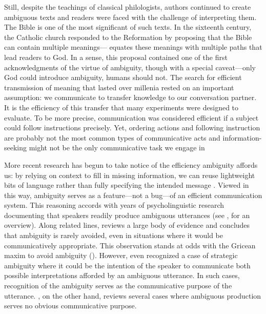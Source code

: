 \documentclass[10pt,a4paper]{article}
\newcommand{\gcs}[1]{\textcolor{blue}{[gcs: #1]}}
\begin{document}
Still, despite the teachings of classical philologists, authors continued to  create ambiguous texts and readers were faced with the challenge of interpreting them. The Bible is one of the most significant of such texts. In the sixteenth century, the Catholic church responded to the Reformation by proposing that the Bible can contain multiple meanings--- equates these meanings with multiple paths that lead readers to God. In a sense, this proposal contained one of the first acknowledgments of the virtue of ambiguity, though with a  special caveat---only God could introduce ambiguity, humans should not. The search for efficient transmission of meaning that lasted over millenia rested on an important assumption: we communicate to transfer knowledge to our conversation partner. It is the efficiency of this transfer that many experiments were designed to evaluate. To be more precise, communication was considered efficient if a subject could follow instructions precisely. Yet, ordering actions and following instruction are probably not  the most common types of communicative acts \cite{foppa1995mutual} and information-seeking might not be the only communicative task we engage in \cite{markova1995preface}

More recent research has begun to take notice of the efficiency ambiguity affords us: by relying on context to fill in missing information, we can reuse lightweight bits of language rather than fully specifying the intended message \cite{levinson2000,piantadosietal2012,wasow2015}. 
Viewed in this way, ambiguity serves as a feature---not a bug---of an efficient communication system.
This reasoning accords with years of psycholinguistic research documenting that speakers readily produce ambiguous utterances (see , for an overview). 
Along related lines,  reviews a large body of evidence and concludes that ambiguity is rarely avoided, even in situations where it would be communicatively appropriate.
This observation stands at odds with the Gricean maxim to avoid ambiguity ().
However, even \citeauthor{grice1975} recognized a case of strategic ambiguity where it could be the intention of the speaker to communicate both possible interpretations afforded by an ambiguous utterance. In such cases, recognition of the ambiguity serves as the communicative purpose of the utterance. \citeauthor{wasow2015}, on the other hand, reviews several cases where ambiguous production serves no obvious communicative purpose.
\end{document}
